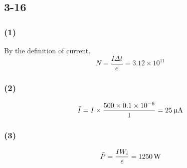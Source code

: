 \documentclass[a4paper,11pt]{amsart}
\theoremstyle{definition}
\begin{document}
	\subsection*{3-16}
	\subsubsection*{(1)}
	By the definition of current.
	$$
	N=\dfrac{I\Delta t}{e}=3.12\times10^{11}
	$$
	\subsubsection*{(2)}
	$$
	\bar{I}=I\times\dfrac{500\times0.1\times10^{-6}}{1}=25\thinspace\mathrm{\upmu A}
	$$
	\subsubsection*{(3)}
	$$
	\bar{P}=\dfrac{IW_i}{e}=1250\thinspace\mathrm{W}
	$$
\end{document}
